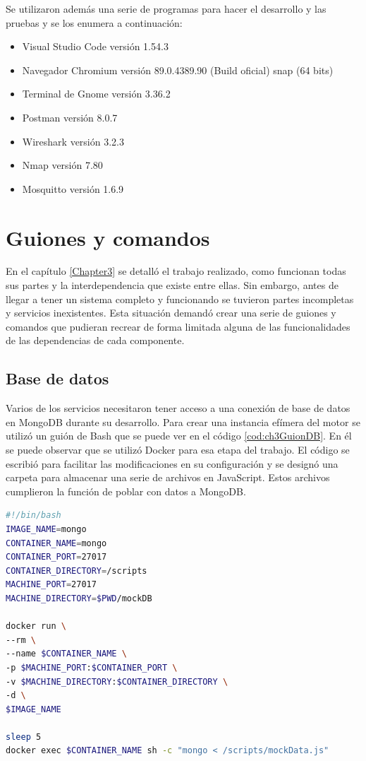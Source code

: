 Se utilizaron además una serie de programas para hacer el desarrollo y las pruebas y se los enumera a continuación:

\begin{itemize}
	\item Visual Studio Code versión 1.54.3
	\item Navegador Chromium versión 89.0.4389.90 (Build oficial) snap (64 bits)
	\item Terminal de Gnome versión 3.36.2
	\item Postman versión 8.0.7
	\item Wireshark versión 3.2.3
	\item Nmap versión 7.80
	\item Mosquitto versión 1.6.9
\end{itemize}

\section{Guiones y comandos}
En el capítulo \ref{Chapter3} se detalló el trabajo realizado, como funcionan todas sus partes y la interdependencia que existe entre ellas.
Sin embargo, antes de llegar a tener un sistema completo y funcionando se tuvieron partes incompletas y servicios inexistentes.
Esta situación demandó crear una serie de guiones y comandos que pudieran recrear de forma limitada alguna de las funcionalidades de las dependencias de cada componente.

\subsection{Base de datos}

Varios de los servicios necesitaron tener acceso a una conexión de base de datos en MongoDB durante su desarrollo.
Para crear una instancia efímera del motor se utilizó un guión de Bash que se puede ver en el código \ref{cod:ch3GuionDB}.
En él se puede observar que se utilizó Docker para esa etapa del trabajo.
El código se escribió para facilitar las modificaciones en su configuración y se designó una carpeta para almacenar una serie de archivos en JavaScript.
Estos archivos cumplieron la función de poblar con datos a MongoDB.

\begin{lstlisting}[language=bash,label=cod:ch3GuionDB,caption=Guión de base de datos.]
#!/bin/bash
IMAGE_NAME=mongo
CONTAINER_NAME=mongo
CONTAINER_PORT=27017
CONTAINER_DIRECTORY=/scripts
MACHINE_PORT=27017
MACHINE_DIRECTORY=$PWD/mockDB

docker run \
--rm \
--name $CONTAINER_NAME \
-p $MACHINE_PORT:$CONTAINER_PORT \
-v $MACHINE_DIRECTORY:$CONTAINER_DIRECTORY \
-d \
$IMAGE_NAME

sleep 5
docker exec $CONTAINER_NAME sh -c "mongo < /scripts/mockData.js"
\end{lstlisting}

